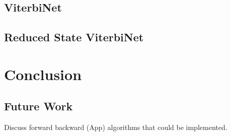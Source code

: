 \documentclass[12pt,a4paper]{report}
\begin{document}
\subsection*{ViterbiNet}
\subsection*{Reduced State ViterbiNet}
\section{Conclusion}
\subsection{Future Work}
Discuss forward backward (App) algorithms that could be implemented.

\newpage

\end{document}
